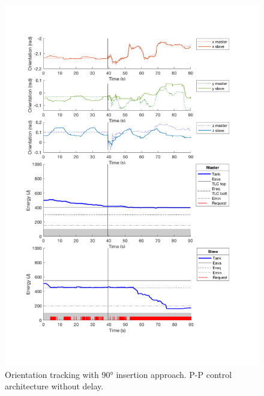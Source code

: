\begin{center}
	\begin{figure}
		\includegraphics[width=\textwidth, keepaspectratio]{plots/pp90/Orientation.pdf}
		\caption{Orientation tracking with 90° insertion approach. P-P control architecture without delay.}
		\label{graph:pp90/Orientation}
	\end{figure}
\end{center}
